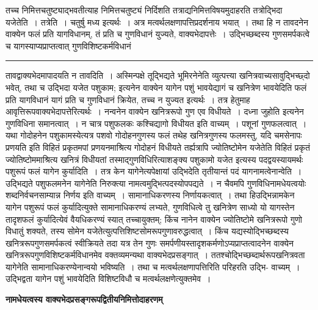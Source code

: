 \documentclass[11pt, openany]{book}
\begin{document}
 तच्च निमित्तचतुष्ट्याद्भवतीत्याह निमित्तचतुष्ट्यं  निर्दिशति तत्राद्यनिमित्तविषयमुदाहरति {\br तत्रोद्भिदा यजेतेति~। तत्रेति~।} चतुर्षु मध्य इत्यर्थः~। अत्र मत्वर्थलक्षणापत्तिप्रदर्शनाय 
\newpage
\lfoot{}
\fancyhead[RE]{[ नामधेयत्वे\textemdash\ }
{\bl\noindent
भयात्~। तथा हि न तावदनेन वाक्येन फलं प्रति यागविधानम्,  तं प्रति च गुणविधानं युज्यते, वाक्यभेदापत्तेः~। उद्भिच्छब्दस्य  गुणसमर्पकत्वे च यागस्याप्यप्राप्तत्वात् गुणविशिष्टकर्मविधानं }\\
\hrule
\vspace{3mm}
\noindent
तावद्वाक्यभेदमापादयति {\br न तावदिति~।} अस्मिन्पक्षे तूद्भिद्यते भूमिरनेनेति व्युत्पत्त्या खनित्रवाच्यसावुद्भिच्छ्दो भवेत्, तथा च {\qt उद्भिदा यजेत  पशुकाम;} इत्यनेन वाक्येन यागेन पशुं भावयेद्यागं च खनित्रेण भावयेदिति फलं प्रति यागविधानं यागं प्रति च गुणविधानं क्रियेत, तच्च न युज्यत इत्यर्थः~। तत्र हेतुमाह आवृत्तिरूपवाक्यभेदापत्तेरित्यर्थः~। नन्वनेन वाक्येन खनित्ररूपो गुण एव विधीयते~। {\qt दध्ना जुहोति}  इत्यनेन गुणविधिना समानत्वात्~। न चात्र पशुफलकः कश्चिद्यागो विधीयत इति वाच्यम्~। पशूनां  गुणफलत्वात्~। यथा गोदोहनेन पशुकामस्येत्यत्र पशवो गोदोहनगुणस्य फलं  तथेह खनित्रगुणस्य फलमस्तु, यदि {\qt चमसेनापः प्रणयति}  इति विहितं प्रकृतमपां प्रणयनमाश्रित्य गोदोहनं विधीयते तर्ह्यत्रापि ज्योतिष्टोमेन यजेतेति विहितं प्रकृतं ज्योतिष्टोममाश्रित्य खनित्रं विधीयतां तस्माद्गुणविधिरित्याशङ्क्य {\qt पशुकामो यजेत}  इत्यस्य पदद्वयस्यायमर्थः {\qt पशुरूपं फलं यागेन कुर्यादिति~}। तत्र केन यागेनेत्यपेक्षायां उद्भिदेति तृतीयान्तं पदं यागनामत्वेनान्वेति~। उद्भिद्यते  पशुफलमनेन यागेनेति निरुक्त्या नामत्वमुद्भित्पदस्योपपद्यते~। न चैवमपि  गुणविधिनामधेयत्वयोः शब्दनिर्वचनसाम्यान्न निर्णय इति वाच्यम्~। सामानाधिकरणस्य निर्णायकत्वात्~। तथा हि\textendash उद्भिन्नामकेन यागेन पशुरूपं फलं  कुर्यादित्युक्ते सामानाधिकरण्यं लभ्यते, गुणविधित्वे तु खनित्रेण साध्यो
यो यागस्तेन तादृशफलं कुर्यादित्येवं वैयधिकरण्यं स्यात् {\qt तच्चायुक्तम्}; किंच  नानेन वाक्येन ज्योतिष्टोमे खनित्ररूपो गुणो विधातुं शक्यते, तस्य सोमेन 
यजेतेत्युत्पत्तिशिष्टसोमरूपगुणावरुद्धत्वात्~। किंच यद्यस्योद्भिच्छब्दस्य खनित्ररूपगुणसमर्पकत्वं स्वीक्रियते तदा यत्र तेन गुणः समर्पणीयस्तादृशकर्मणोऽप्यप्राप्तत्वादनेन वाक्येन खनित्ररूपगुणविशिष्टकर्मविधानमेव वक्तव्यमन्यथा  वाक्यभेदप्रसङ्गात्~। ततश्चोद्भिच्छब्दार्थरूपखनित्रवता यागेनेति सामानाधिकरण्येनान्वयो भविष्यति~। तथा च मत्वर्थलक्षणापत्तिरिति परिहरति {\br उद्भि-}
\newpage
\fancyhead[LO]{निमित्तचतुष्टयम् ]}
{\bl\noindent
वाच्यम्~। उद्भिद्वता यागेन पशुं भावयेदिति विशिष्टविधौ च  मत्वर्थलक्षणेत्युक्तमेव~।~}
\begin{center}
 \textbf{नामधेयत्वस्य वाक्यभेदप्रसङ्गरूपद्वितीयनिमित्तोदाहरणम् }   
\end{center}
 
\end{document}
